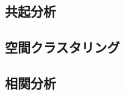 \documentclass[11pt,j4a]{jarticle}
\begin{document}
\subsection{共起分析}

\subsection{空間クラスタリング}

\subsection{相関分析}








\clearpage


\end{document}
